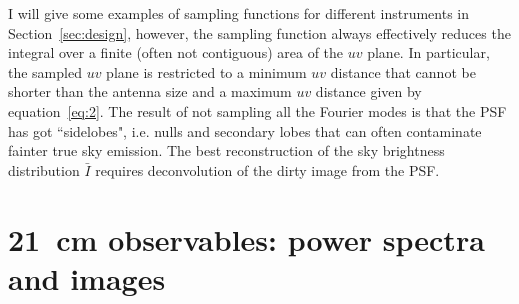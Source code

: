 I will give some examples of sampling functions for different instruments in Section~\ref{sec:design}, however, the sampling function always effectively reduces the integral over a finite (often not contiguous) area of the $uv$ plane. In particular, the sampled $uv$ plane is restricted to a minimum $uv$ distance that cannot be shorter than the antenna size and a maximum $uv$ distance given by equation~\ref{eq:2}. The result of not sampling all the Fourier modes is that the PSF has got ``sidelobes", i.e. nulls and secondary lobes that can often contaminate fainter true sky emission. The best reconstruction of the sky brightness distribution ${\bar I}$ requires deconvolution of the dirty image from the PSF. 




\section{21~cm observables: power spectra and images}
\label{sec:observables}

